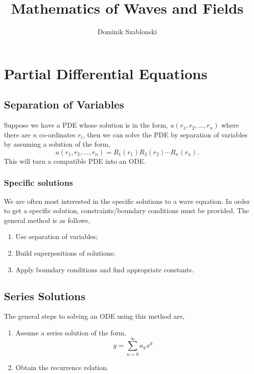 \documentclass{book}
\title{Mathematics of Waves and Fields}
\author{Dominik Szablonski}
\begin{document}
\maketitle

\tableofcontents

\chapter{Partial Differential Equations}
\section{Separation of Variables}
Suppose we have a PDE whose solution is in the form, $u(r_1,r_2,\ldots,r_n)$ where there are $n$ co-ordinates $r_i$, then we can solve the PDE by separation of variables by assuming a solution of the form,
\begin{equation}
	u(r_1,r_2,\ldots,r_n) = R_1(r_1)R_2(r_2)\cdots R_n(r_n).
\end{equation}
This will turn a compatible PDE into an ODE.
\subsection{Specific solutions}
We are often most interested in the specific solutions to a wave equation. In order to get a specific solution, constraints/boundary conditions must be provided. The general method is as follows,
\begin{enumerate}
	\item Use separation of variables;
	\item Build superpositions of solutions;
	\item Apply boundary conditions and find appropriate constants.
\end{enumerate}
\section{Series Solutions}
The general steps to solving an ODE using this method are,
\begin{enumerate}
	\item Assume a series solution of the form,
	\begin{equation}
		y = \sum_{n=0}^{\infty}a_kx^k
	\end{equation}
	\item Obtain the recurrence relation.
\end{enumerate}
\end{document}
